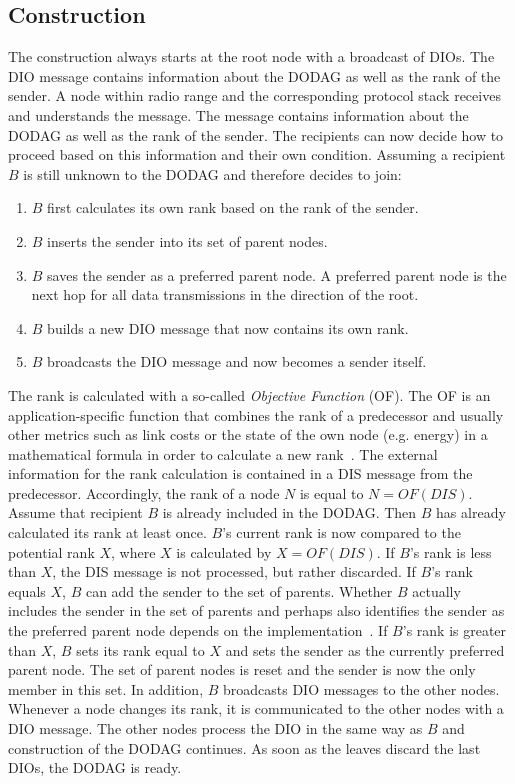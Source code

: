 \documentclass[english,version-2019-11]{uzl-thesis}
\begin{document}
\subsection{Construction}
The construction always starts at the root node with
a broadcast of DIOs. The DIO message contains
information about the DODAG as well as the rank
of the sender. A node within radio range and the
corresponding protocol stack receives and understands
the message. The message contains information
about the DODAG as well as the rank of the sender.
The recipients can now decide how to proceed based
on this information and their own condition.
Assuming a recipient $B$ is still unknown to the DODAG
and therefore decides to join:
\begin{enumerate}
 \item $B$ first calculates its own rank based on the rank of the sender.
 \item $B$ inserts the sender into its set of parent nodes.
 \item $B$ saves the sender as a preferred parent node. 
 A preferred parent node is the next hop for all data transmissions in the direction of the root.
 \item $B$ builds a new DIO message that now contains its own rank.
 \item $B$ broadcasts the DIO message and now becomes a sender itself.
\end{enumerate}
The rank is calculated with a so-called \emph{Objective Function} (OF).
The OF is an application-specific function that combines the rank of a predecessor
and usually other metrics such as link costs or the state of the own node
(e.g. energy) in a mathematical formula in order to calculate a new rank~\cite{rfc6552}.
The external information for the rank calculation is contained in a DIS message
from the predecessor. Accordingly, the rank of a node $N$ is equal to $N = OF(DIS)$.
Assume that recipient $B$ is already included in the DODAG.
Then $B$ has already calculated its rank at least once.
$B$'s current rank is now compared to the potential rank $X$,
where $X$ is calculated by $X = OF(DIS)$.
If $B$'s rank is less than $X$, the DIS message is not processed, but rather discarded.
If $B$'s rank equals $X$, $B$ can add the sender to the set of parents.
Whether $B$ actually includes the sender in the set of parents
and perhaps also identifies the sender as the preferred
parent node depends on the implementation~\cite{rfc6550}.
If $B$'s rank is greater than $X$, $B$ sets its rank equal to $X$ and sets
the sender as the currently preferred parent node.
The set of parent nodes is reset and the sender is now the only member in this set.
In addition, $B$ broadcasts DIO messages to the other nodes.
Whenever a node changes its rank,
it is communicated to the other nodes with a DIO message.
The other nodes process the DIO in the same way as $B$
and construction of the DODAG continues. 
As soon as the leaves discard the last DIOs, the DODAG is ready.
\end{document}

